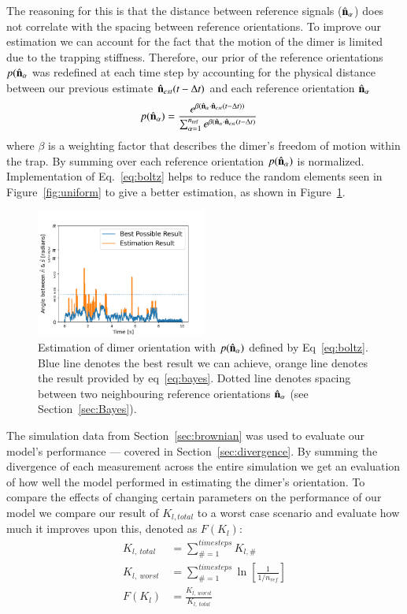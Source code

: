 \documentclass[final,  3p]{elsarticle}
\begin{document}
The reasoning for this is that the distance between reference signals ($\hat{\bf n}_\alpha$) does not correlate with the spacing between reference orientations. To improve our estimation we can account for the fact that the motion of the dimer is limited due to the trapping stiffness. Therefore, our prior of the reference orientations $p(\hat{\bf n}_\alpha$ was redefined at each time step by accounting for the physical distance between our previous estimate $\hat{\bf n}_{est}(t-\Delta t)$ and each reference orientation $\hat{\bf n}_\alpha$
\begin{align}
  p(\hat{\bf n}_\alpha)
  &=\frac{e^{\beta (\hat{\bf n}_\alpha 
  	\cdot \hat{\bf n}_{est}(t-\Delta t))}}
  {\sum_{\alpha=1}^{n_{\rm ref}}
	e^{\beta (\hat{\bf n}_\alpha 
	\cdot \hat{\bf n}_{est}(t-\Delta t)}}
	\label{eq:boltz}
\end{align}
where $\beta$ is a weighting factor that describes the dimer's freedom
of motion within the trap.  By summing over each reference orientation
$p(\hat{\bf n}_\alpha)$ is normalized. Implementation of
Eq.~\eqref{eq:boltz} helps to reduce the random elements seen in
Figure~\ref{fig:uniform} to give a better estimation, as shown in
Figure~\ref{fig:biased}.


\begin{figure}[h]
\centering
\includegraphics[width=0.5\textwidth]{./Images/fig4.png}
\caption{\label{fig:biased}
%
Estimation of dimer orientation with $p(\hat{\bf n}_\alpha)$ defined
by Eq~\eqref{eq:boltz}.  Blue line denotes the best result we can
achieve, orange line denotes the result provided by eq~\ref{eq:bayes}.
Dotted line denotes spacing between two neighbouring reference
orientations $\hat{\bf n}_\alpha$ (see Section~\ref{sec:Bayes}).
}
\end{figure} 


The simulation data from Section~\ref{sec:brownian} was used to evaluate our model's performance --- covered in Section~\ref{sec:divergence}. By summing the divergence of each measurement across the entire simulation we get an evaluation of how well the model performed in estimating the dimer's orientation. To compare the effects of changing certain parameters on the performance of our model we compare our result of $K_{l,total}$ to a worst case scenario and evaluate how much it improves upon this, denoted as $F(K_l)$:
\begin{align}
  K_{l, \ total} &= \sum\limits_{\# =1}^{timesteps} K_{l,\#}
  \\
  K_{l, \ worst} &= \sum\limits_{\#=1}^{timesteps} \ln \left[\frac{1}{1/n_{ref}} \right]
  \\
F(K_l) &= \frac{K_{l,\ worst}}{K_{l, \ total}}
\end{align}
\end{document}
